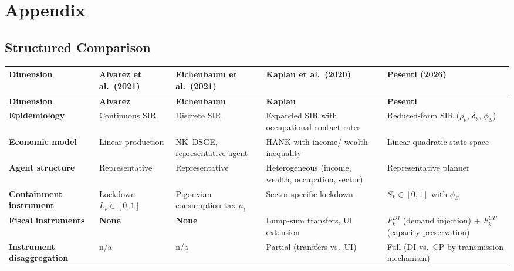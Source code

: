 \documentclass[12pt, a4paper]{article}
\begin{document}
\newpage
\FloatBarrier



\newpage
\section{Appendix}

\appendix

\subsection{Structured Comparison}
\label{sec:structured_comp}

\begin{small}
\begin{longtable}{P{3.2cm}P{3cm}P{3cm}P{3cm}P{3cm}}
\toprule
\textbf{Dimension} & \textbf{Alvarez et al.\ (2021)} & \textbf{Eichenbaum et al.\ (2021)} & \textbf{Kaplan et al.\ (2020)} & \textbf{Pesenti (2026)} \\
\midrule
\endfirsthead
\toprule
\textbf{Dimension} & \textbf{Alvarez} & \textbf{Eichenbaum} & \textbf{Kaplan} & \textbf{Pesenti} \\
\midrule
\endhead

\textbf{Epidemiology} & Continuous SIR & Discrete SIR & Expanded SIR with occupational contact rates & Reduced-form SIR ($\rho_\theta$, $\delta_\theta$, $\phi_S$) \\
\midrule

\textbf{Economic model} & Linear production & NK--DSGE, representative agent & HANK with income/ wealth inequality & Linear-quadratic state-space \\
\midrule

\textbf{Agent structure} & Representative & Representative & Heterogeneous (income, wealth, occupation, sector) & Representative planner \\
\midrule

\textbf{Containment instrument} & Lockdown $L_t \in [0,1]$ & Pigouvian consumption tax $\mu_t$ & Sector-specific lockdown & $S_k \in [0,1]$ with $\phi_S$ \\
\midrule

\textbf{Fiscal instruments} & \textbf{None} & \textbf{None} & Lump-sum transfers, UI extension & $F_k^{DI}$ (demand injection) + $F_k^{CP}$ (capacity preservation) \\
\midrule

\textbf{Instrument disaggregation} & n/a & n/a & Partial (transfers vs.\ UI) & Full (DI vs.\ CP by transmission mechanism) \\
\midrule


\end{longtable}
\end{small}
\end{document}
